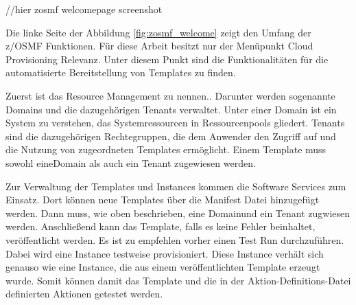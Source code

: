 //hier zosmf welcomepage screenshot

Die linke Seite der Abbildung \ref{fig:zosmf_welcome} zeigt den Umfang der z/OSMF  Funktionen.
Für diese Arbeit besitzt nur der Menüpunkt \glqq Cloud Provisioning\grqq{} Relevanz.
Unter diesem Punkt sind die Funktionalitäten für die automatisierte Bereitstellung von Templates zu finden.
\cite{Rotthove.2018}

Zuerst ist das \glqq Resource Management\grqq{} zu nennen..
Darunter werden sogenannte \glqq Domains\grqq{} und die dazugehörigen \glqq Tenants\grqq{} verwaltet.
Unter einer \glqq Domain\grqq{} ist ein System zu verstehen, das Systemressourcen in Ressourcenpools gliedert.
\glqq Tenants\grqq{} sind die dazugehörigen Rechtegruppen, die dem Anwender den Zugriff auf und die Nutzung von zugeordneten Templates ermöglicht.
Einem Template muss sowohl eine\glqq Domain\grqq{} als auch ein \glqq Tenant\grqq{} zugewiesen werden.
\cite{Rotthove.2018}

Zur Verwaltung der Templates und Instances kommen die \glqq Software Services\grqq{} zum Einsatz.
Dort können neue Templates über die \glqq Manifest Datei\grqq{} hinzugefügt werden.
Dann muss, wie oben beschrieben, eine \glqq Domain\dq und ein \glqq Tenant\grqq{} zugwiesen werden.
Anschließend kann das Template, falls es keine Fehler beinhaltet, veröffentlicht werden.
Es ist zu empfehlen vorher einen \glqq Test Run\grqq{} durchzuführen.
Dabei wird eine Instance testweise provisioniert.
Diese Instance verhält sich genauso wie eine Instance, die aus einem veröffentlichten Template erzeugt wurde.
Somit können damit das Template und die in der Aktion-Definitions-Datei definierten Aktionen getestet werden.
\cite{Rotthove.2018}
